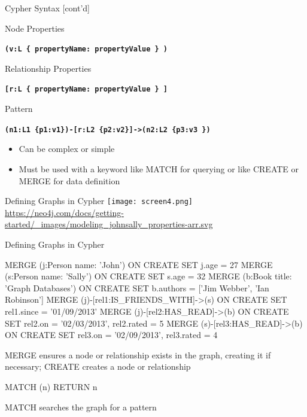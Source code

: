 \documentclass[ignorenonframetext,xcolor=x11names]{beamer}
\begin{document}
\begin{frame}[fragile]{Cypher Syntax \small [cont'd]}
\small
\begin{block}{Node Properties}
\centering

\textbf{\texttt{(v:L \{ propertyName: propertyValue \} )}}
\end{block}

\begin{block}{Relationship Properties}
\centering

\textbf{\texttt{[r:L \{ propertyName: propertyValue \} ]}}
\end{block}

\begin{block}{Pattern}
\centering

\textbf{\texttt{(n1:L1 \{p1:v1\})-[r:L2 \{p2:v2\}]->(n2:L2 \{p3:v3 \})}}
\begin{itemize}
  \item Can be complex or simple
  \item Must be used with a keyword like MATCH for querying or like CREATE or MERGE for data definition
\end{itemize}
\end{block}
\end{frame}

\begin{frame}{Defining Graphs in Cypher}
\centering
\texttt{[image: screen4.png]}
\tiny{\url{https://neo4j.com/docs/getting-started/_images/modeling_johnsally_properties-arr.svg}}
\end{frame}

\begin{frame}[fragile]{Defining Graphs in Cypher}

\scriptsize
\begin{cyphercode}
MERGE (j:Person {name: 'John'})
  ON CREATE SET j.age = 27
MERGE (s:Person {name: 'Sally'})
  ON CREATE SET s.age = 32
MERGE (b:Book {title: 'Graph Databases'})
  ON CREATE SET b.authors = ['Jim Webber', 'Ian Robinson']
MERGE (j)-[rel1:IS_FRIENDS_WITH]->(s)
  ON CREATE SET rel1.since = '01/09/2013'
MERGE (j)-[rel2:HAS_READ]->(b)
  ON CREATE SET rel2.on = '02/03/2013', rel2.rated = 5
MERGE (s)-[rel3:HAS_READ]->(b)
  ON CREATE SET rel3.on = '02/09/2013', rel3.rated = 4
\end{cyphercode}
\small
MERGE ensures a node or relationship exists in the graph, creating it if necessary; CREATE creates a node or relationship
\scriptsize
\begin{cyphercode}
MATCH (n) RETURN n
\end{cyphercode}
\small
MATCH searches the graph for a pattern
\end{frame}
\end{document}
